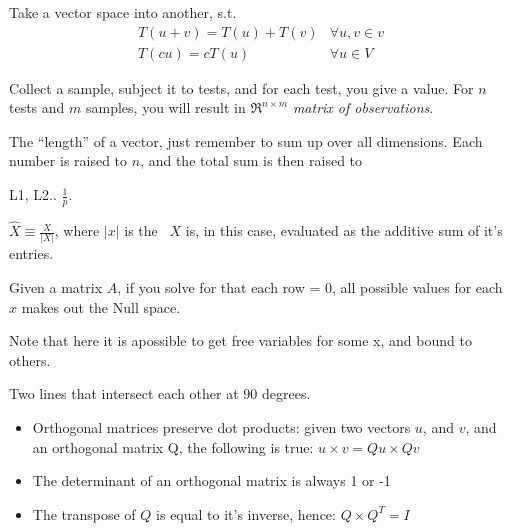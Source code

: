 \begin{definition}\label{lintrans}
    Take a vector space into another, s.t.\
    \begin{align}
        T(u + v) = T(u) + T(v) &\forall u,v \in v \\
        T(cu) = cT(u) &\forall u \in V
    \end{align}
\end{definition}

\begin{definition}
    Collect a sample, subject it to tests, and for each test, you give a value.
    For $n$ tests and $m$ samples, you will result in $\Re^{n\times{m}}$ 
    \textit{matrix of observations}.
\end{definition}

\begin{definition}[Norm]
    The ``length'' of a vector, just remember to sum up over all dimensions.
    Each number is raised to $n$, and the total sum is then raised to

    L1, L2..
$\frac{1}{p}$.  \end{definition}

\begin{definition}
    $ \hat{X} \equiv \frac{X}{|X|} $, where $|x|$ is the~
    $X$ is, in this case, evaluated as the additive sum of it's entries.
\end{definition}

\begin{definition}
    Given a matrix $A$, if you solve for that each row = 0,
    all possible values for each $x$ makes out the Null space.

    Note that here it is apossible to get free variables for 
    some x, and bound to others.

\end{definition}



\begin{definition}[Orthogonal]\label{orthogonal}
    Two lines that intersect each other at 90 degrees.\\
    \begin{itemize}
        \item Orthogonal matrices preserve dot products:
        given two vectors $u$, and $v$, and an orthogonal matrix Q,
        the following is true:
        $u \times v = Qu \times Qv$
        \item The determinant of an orthogonal matrix is always 1 or -1
        \item The transpose of $Q$ is equal to it's inverse, hence:
            $Q \times Q^{T} = I$
    \end{itemize}
\end{definition}

